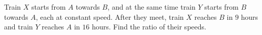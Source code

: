 Train $X$ starts from $A$ towards $B$, and at the same time train $Y$ starts from $B$ towards $A$, each at constant speed. After they meet, train $X$ reaches $B$ in $9$ hours and train $Y$ reaches $A$ in $16$ hours. Find the ratio of their speeds.
